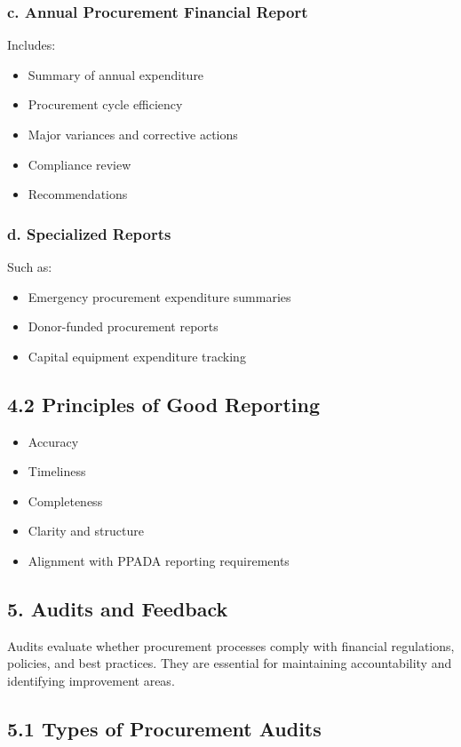 \documentclass[10pt]{article}
\begin{document}
\subsubsection*{c. Annual Procurement Financial Report}
Includes:

\begin{itemize}
  \item Summary of annual expenditure
  \item Procurement cycle efficiency
  \item Major variances and corrective actions
  \item Compliance review
  \item Recommendations
\end{itemize}

\subsubsection*{d. Specialized Reports}
Such as:

\begin{itemize}
  \item Emergency procurement expenditure summaries
  \item Donor-funded procurement reports
  \item Capital equipment expenditure tracking
\end{itemize}

\subsection*{4.2 Principles of Good Reporting}
\begin{itemize}
  \item Accuracy
  \item Timeliness
  \item Completeness
  \item Clarity and structure
  \item Alignment with PPADA reporting requirements
\end{itemize}

\subsection*{5. Audits and Feedback}
Audits evaluate whether procurement processes comply with financial regulations, policies, and best practices. They are essential for maintaining accountability and identifying improvement areas.

\subsection*{5.1 Types of Procurement Audits}
\end{document}
